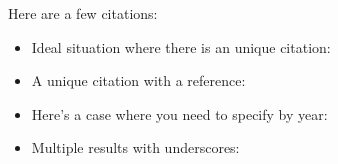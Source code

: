 \documentclass{article}
\begin{document}
Here are a few citations:
\begin{itemize}
    \item
        Ideal situation where there is an unique citation: \cite{mazur:eisenstein}
    \item
        A unique citation with a reference: \cite[Prop. 14.2]{mazur:eisenstein}
    \item
        Here's a case where you need to specify by year:
        \cite{mazur:modular:2000}
    \item
        Multiple results with underscores:
        \cite{ribet:galois_real_multiplication}
\end{itemize}
    


\end{document}
